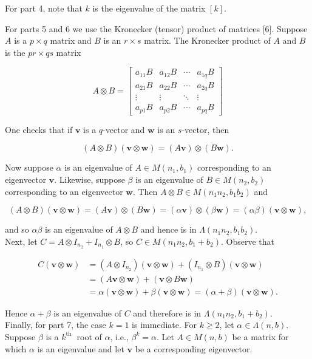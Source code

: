 \documentclass[11pt,letterpaper]{article}
\begin{document}
For part 4, note that $k$ is the eigenvalue of the matrix $[k]$.


For parts 5 and 6 we use the Kronecker (tensor) product of matrices [6]. Suppose $A$ is a $p \times q$ matrix and $B$ is an $r \times s$ matrix. The Kronecker product of $A$ and $B$ is the $p r \times q s$ matrix

\[
A \otimes B=\left[\begin{array}{cccc}
a_{11} B & a_{12} B & \cdots & a_{1 q} B \\
a_{21} B & a_{22} B & \cdots & a_{2 q} B \\
\vdots & \vdots & \ddots & \vdots \\
a_{p 1} B & a_{p 2} B & \cdots & a_{p q} B
\end{array}\right]
\]

One checks that if $\mathbf v$ is a $q$-vector and $\mathbf w$ is an $s$-vector, then

\[
(A \otimes B)(\mathbf{v} \otimes \mathbf{w})=(A \mathbf{v}) \otimes(B \mathbf{w}) .
\]

Now suppose $\alpha$ is an eigenvalue of $A \in M\left(n_{1}, b_{1}\right)$ corresponding to an eigenvector $\mathbf v$. Likewise, suppose $\beta$ is an eigenvalue of $B \in M\left(n_{2}, b_{2}\right)$ corresponding to an eigenvector $\mathbf{w}$. Then $A \otimes B \in M\left(n_{1} n_{2}, b_{1} b_{2}\right)$ and

\[
(A \otimes B)(\mathbf{v} \otimes \mathbf{w})=(A \mathbf{v}) \otimes(B \mathbf{w})=(\alpha \mathbf{v}) \otimes(\beta \mathbf{w})=(\alpha \beta)(\mathbf{v} \otimes \mathbf{w}),
\]

and so $\alpha \beta$ is an eigenvalue of $A \otimes B$ and hence is in $\Lambda\left(n_{1} n_{2}, b_{1} b_{2}\right)$.\\
Next, let $C=A \otimes I_{n_{2}}+I_{n_{1}} \otimes B$, so $C \in M\left(n_{1} n_{2}, b_{1}+b_{2}\right)$. Observe that

\[
\begin{aligned}
C(\mathbf{v} \otimes \mathbf{w}) & =\left(A \otimes I_{n_{2}}\right)(\mathbf{v} \otimes \mathbf{w})+\left(I_{n_{1}} \otimes B\right)(\mathbf{v} \otimes \mathbf{w}) \\
& =(A \mathbf{v} \otimes \mathbf{w})+(\mathbf{v} \otimes B \mathbf{w}) \\
& =\alpha(\mathbf{v} \otimes \mathbf{w})+\beta(\mathbf{v} \otimes \mathbf{w})=(\alpha+\beta)(\mathbf{v} \otimes \mathbf{w}) .
\end{aligned}
\]

Hence $\alpha+\beta$ is an eigenvalue of $C$ and therefore is in $\Lambda\left(n_{1} n_{2}, b_{1}+b_{2}\right)$.\\
Finally, for part 7, the case $k=1$ is immediate. For $k\geq2$, let $\alpha \in \Lambda(n, b)$. Suppose $\beta$ is a $k^{\text {th }}$ root of $\alpha$, i.e., $\beta^{k}=\alpha$. Let $A \in M(n, b)$ be a matrix for which $\alpha$ is an eigenvalue and let $\mathbf{v}$ be a corresponding eigenvector.
\end{document}
